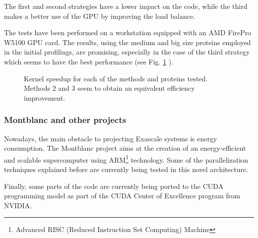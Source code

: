 The first and second strategies have a lower impact on the code, while the third makes a better use of the GPU by improving the
load balance. 

The tests have been performed on a workstation equipped with an AMD FirePro W5100 GPU card. The results, using the
medium and big size proteins employed in the initial profilings, are promising, especially in the case of the third
strategy which seems to have the best performance (see Fig. \ref{fig:solvent_speedup} ).

\begin{figure}


\caption{Kernel speedup for each of the methods and proteins tested. Methods 2 and 3 seem to obtain an equivalent efficiency improvement. }

\label{fig:solvent_speedup}

\end{figure}

\subsubsection{Montblanc and other projects }

Nowadays, the main obstacle to projecting Exascale systems is energy consumption. The Montblanc project aims at the
creation of an energy-efficient and scalable supercomputer using ARM\footnote{Advanced RISC (Reduced Instruction Set
Computing) Machine} technology. Some of the parallelization techniques explained before are currently being tested in
this novel architecture.

Finally, some parts of the code are currently being ported to the CUDA programming model as part of the CUDA Center of
Excellence program from NVIDIA.

\newpage



